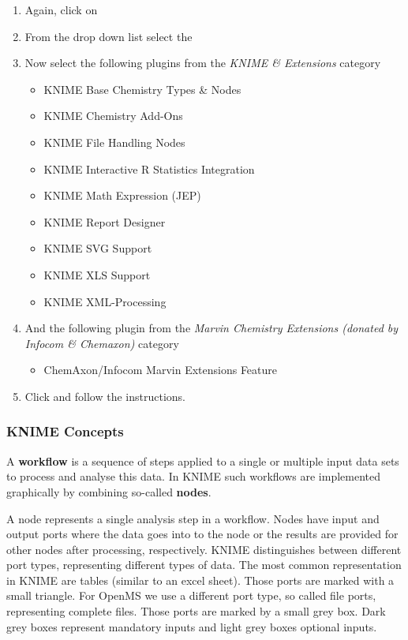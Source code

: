 \begin{enumerate}
\item Again, click on 
\item From the  drop down list select the 
\item Now select the following plugins from the \textit{KNIME \& Extensions} category
    \begin{itemize}
    \item KNIME Base Chemistry Types \& Nodes
    \item KNIME Chemistry Add-Ons
    \item KNIME File Handling Nodes
    \item KNIME Interactive R Statistics Integration
    \item KNIME Math Expression (JEP)
    \item KNIME Report Designer
    \item KNIME SVG Support
    \item KNIME XLS Support
    \item KNIME XML-Processing
    \end{itemize}
\item And the following plugin from the \textit{Marvin Chemistry Extensions (donated by Infocom \& Chemaxon)} category
    \begin{itemize}
    \item ChemAxon/Infocom Marvin Extensions Feature
    \end{itemize}
\item Click  and follow the instructions.
\end{enumerate}

\subsubsection{KNIME Concepts}

A \textbf{workflow} is a sequence of steps applied to a single or multiple input data sets to process and analyse this data.
In KNIME such workflows are implemented graphically by combining so-called \textbf{nodes}.

A node represents a single analysis step in a workflow.
Nodes have input and output ports where the data goes into to the node or the results are provided for other nodes after processing, respectively.
KNIME distinguishes between different port types, representing different types of data.
The most common representation in KNIME are tables (similar to an excel sheet).
Those ports are marked with a small triangle.
For OpenMS we use a different port type, so called file ports, representing complete files.
Those ports are marked by a small grey box.
Dark grey boxes represent mandatory inputs and light grey boxes optional inputs.

